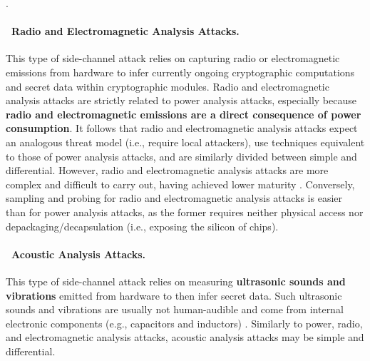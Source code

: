 .

\paragraph*{\faBroadcastTower~Radio and Electromagnetic Analysis Attacks.} This type of side-channel attack relies on capturing radio or electromagnetic emissions from hardware to infer currently ongoing cryptographic computations and secret data within cryptographic modules. Radio and electromagnetic analysis attacks are strictly related to power analysis attacks, especially because \textbf{radio and electromagnetic emissions are a direct consequence of power consumption}. It follows that radio and electromagnetic analysis attacks expect an analogous threat model (i.e., require local attackers), use techniques equivalent to those of power analysis attacks, and are similarly divided between simple and differential. However, radio and electromagnetic analysis attacks are more complex and difficult to carry out, having achieved lower maturity \cite{sayakkara_survey_2019}. Conversely, sampling and probing for radio and electromagnetic analysis attacks is easier than for power analysis attacks, as the former requires neither physical access nor depackaging/decapsulation (i.e., exposing the silicon of chips).

\paragraph*{\faMicrophone~Acoustic Analysis Attacks.} This type of side-channel attack relies on measuring \textbf{ultrasonic sounds and vibrations} emitted from hardware to then infer secret data. Such ultrasonic sounds and vibrations are usually not human-audible and come from internal electronic components (e.g., capacitors and inductors) \cite{genkin_acoustic_2017}. Similarly to power, radio, and electromagnetic analysis attacks, acoustic analysis attacks may be simple and differential. 

